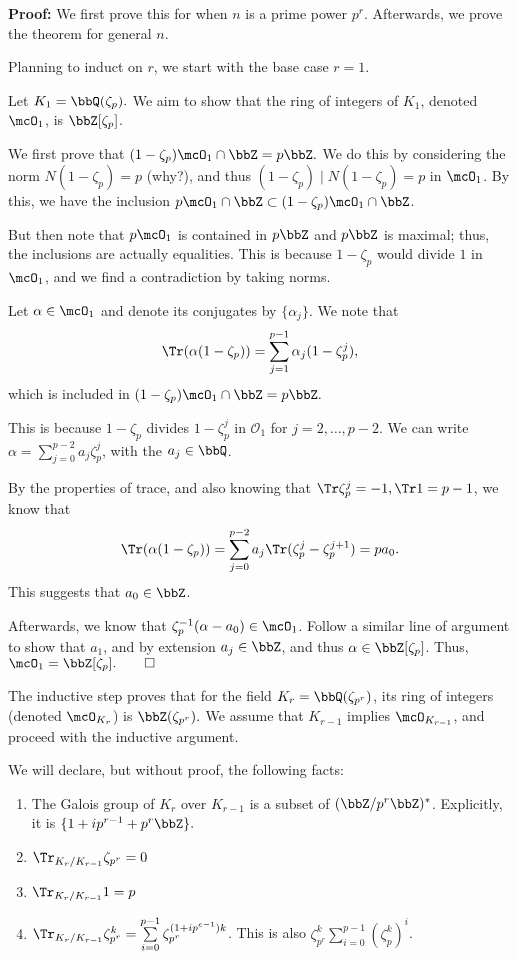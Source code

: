 \documentclass[a4paper, 12pt,oneside,openany]{book}
\begin{document}

\textbf{Proof:} We first prove this for when $n$ is a prime power $p^r$. Afterwards, we prove the theorem for general $n$.

Planning to induct on $r$, we start with the base case $r=1$.

Let $K_1=\bbQ(\zeta_p).$ We aim to show that the ring of integers of $K_1$, denoted $\mcO_1$, is $\bbZ[\zeta_p]$.

We first prove that $(1-\zeta_p)\mcO_1 \cap \bbZ = p\bbZ.$ We do this by considering the norm $N(1-\zeta_p)=p$ (why?), and thus $(1-\zeta_p) \mid N(1-\zeta_p)=p$ in $\mcO_1$. By this, we have the inclusion $p\mcO_1 \cap \bbZ \subset (1-\zeta_p)\mcO_1 \cap \bbZ$. 

But then note that $p\mcO_1$ is contained in $p\bbZ$ and $p\bbZ$ is maximal; thus, the inclusions are actually equalities. This is because $1-\zeta_p$ would divide $1$ in $\mcO_1$, and we find a contradiction by taking norms.

Let $\alpha \in\mcO_1$ and denote its conjugates by $\{\alpha_j\}.$ We note that $$\Tr(\alpha(1-\zeta_p))=\sum\limits_{j=1}^{p-1} \alpha_j(1-\zeta_p^j),$$ which is included in $(1-\zeta_p)\mcO_1 \cap \bbZ = p\bbZ.$

This is because $1-\zeta_p$ divides $1-\zeta_p^j$ in $\mathcal{O}_1$ for $j=2, \dots, p-2$. We can write $\alpha=\sum\limits_{j=0}^{p-2} a_j \zeta_p^j$, with the $a_j \in \bbQ$. 

By the properties of trace, and also knowing that $\Tr \zeta_p^j=-1, \Tr 1 = p-1$, we know that $$\Tr(\alpha(1-\zeta_p))=\sum\limits_{j=0}^{p-2} a_j \Tr(\zeta_p^j-\zeta_p^{j+1})=pa_0.$$ This suggests that $a_0\in \bbZ$. 

Afterwards, we know that $\zeta_p^{-1}(\alpha-a_0) \in \mcO_1$. Follow a similar line of argument to show that $a_1$, and by extension $a_j \in \bbZ$, and thus $\alpha \in \bbZ[\zeta_p]$. Thus, $\mcO_1=\bbZ[\zeta_p]. \qed$

The inductive step proves that for the field $K_r=\bbQ(\zeta_{p^r})$, its ring of integers (denoted $\mcO_{K_r}$) is $\bbZ(\zeta_{p^r}).$ We assume that $K_{r-1}$ implies $\mcO_{K_{r-1}}$, and proceed with the inductive argument.

We will declare, but without proof, the following facts:

\begin{enumerate}
	\item The Galois group of $K_r$ over $K_{r-1}$ is a subset of $(\bbZ/p^r\bbZ)^*$. Explicitly, it is $\{1+ip^{r-1}+p^r\bbZ\}.$
	\item $\Tr_{K_r/K_{r-1}} \zeta_{p^r}=0$
	\item $\Tr_{K_r/K_{r-1}} 1 =p$
	\item $\Tr_{K_r/K_{r-1}} \zeta_{p^r}^k =\sum\limits_{i=0}^{p-1} \zeta_{p^r}^{(1+ip^{e-1})k}$. This is also $\zeta_{p^r}^k \sum\limits_{i=0}^{p-1}(\zeta_p^k)^i$.
\end{enumerate}
\end{document}
